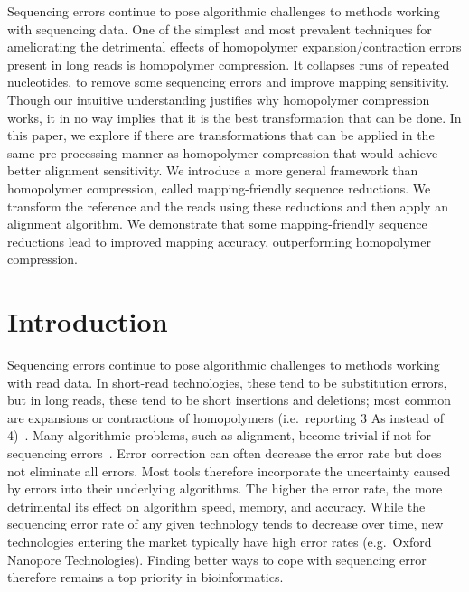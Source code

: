 \documentclass[
  11pt,
  twoside,
  BCOR=10mm,
  listof=totoc]{scrbook}
\begin{document}
Sequencing errors continue to pose algorithmic challenges to methods working with sequencing data. One of the simplest and most prevalent techniques for ameliorating the detrimental effects of homopolymer expansion/contraction errors present in long reads is homopolymer compression. It collapses runs of repeated nucleotides, to remove some sequencing errors and improve mapping sensitivity. Though our intuitive understanding justifies why homopolymer compression works, it in no way implies that it is the best transformation that can be done. In this paper, we explore if there are transformations that can be applied in the same pre-processing manner as homopolymer compression that would achieve better alignment sensitivity. We introduce a more general framework than homopolymer compression, called mapping-friendly sequence reductions. We transform the reference and the reads using these reductions and then apply an alignment algorithm. We demonstrate that some mapping-friendly sequence reductions lead to improved mapping accuracy, outperforming homopolymer compression.

\hypertarget{hpc-introduction}{%
\section{Introduction}\label{hpc-introduction}}

Sequencing errors continue to pose algorithmic challenges to methods working with read data. In short-read technologies, these tend to be substitution errors, but in long reads, these tend to be short insertions and deletions; most common are expansions or contractions of homopolymers (i.e.~reporting 3 As instead of 4)~\autocite{dohmBenchmarkingLongreadCorrection2020}. Many algorithmic problems, such as alignment, become trivial if not for sequencing errors~\autocite{gusfieldAlgorithmsStringsTrees1997}. Error correction can often decrease the error rate but does not eliminate all errors. Most tools therefore incorporate the uncertainty caused by errors into their underlying algorithms. The higher the error rate, the more detrimental its effect on algorithm speed, memory, and accuracy. While the sequencing error rate of any given technology tends to decrease over time, new technologies entering the market typically have high error rates (e.g.~Oxford Nanopore Technologies). Finding better ways to cope with sequencing error therefore remains a top priority in bioinformatics.
\end{document}
